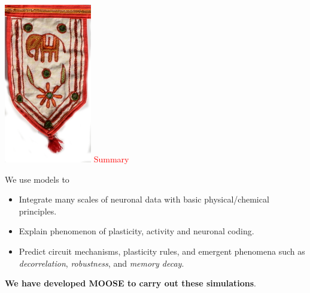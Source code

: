 \documentclass[a0paper,12pt]{article}
\newenvironment{Figure}
  {\par\medskip\noindent\minipage{\linewidth}}
  {\endminipage\par\medskip}
\newcommand{\HEADING}[1]
{
    \includegraphics[scale=0.25]{./images/heading.png} \vspace{-1cm}
    {\fontsize{2cm}{2em}\selectfont \textcolor{red}{#1}}
    \vspace{2cm}
}
\begin{document}
\begin{multicols}{3}
\begin{Figure}
    
    \HEADING{Summary}

    \HUGE We use models to
    \begin{itemize}
            
        \item Integrate many scales of neuronal data with basic
            physical/chemical principles.
        \item Explain phenomenon of plasticity, activity and neuronal coding.
        \item Predict circuit mechanisms, plasticity rules, and emergent
            phenomena such as \emph{decorrelation}, \emph{robustness}, and
            \emph{memory decay}.

    \end{itemize}

    \textbf{We have developed MOOSE to carry out these simulations}.

\end{Figure}

\end{multicols}
\end{document}
